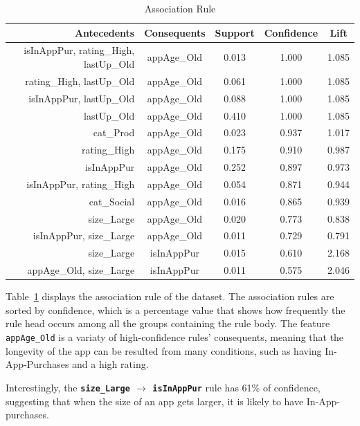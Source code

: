 \begin{table}
    \centering
    \scriptsize
        \begin{tabular}{rcccc}
        \toprule
        Antecedents & Consequents & Support & Confidence & Lift \\
        \midrule
        {isInAppPur, rating\_High, lastUp\_Old} & {appAge\_Old} & 0.013 & 1.000 & 1.085 \\
        {rating\_High, lastUp\_Old} & {appAge\_Old} & 0.061 & 1.000 & 1.085 \\
        {isInAppPur, lastUp\_Old} & {appAge\_Old} & 0.088 & 1.000 & 1.085 \\
        {lastUp\_Old} & {appAge\_Old} & 0.410 & 1.000 & 1.085 \\
        {cat\_Prod} & {appAge\_Old} & 0.023 & 0.937 & 1.017 \\
        {rating\_High} & {appAge\_Old} & 0.175 & 0.910 & 0.987 \\
        {isInAppPur} & {appAge\_Old} & 0.252 & 0.897 & 0.973 \\
        {isInAppPur, rating\_High} & {appAge\_Old} & 0.054 & 0.871 & 0.944 \\
        {cat\_Social} & {appAge\_Old} & 0.016 & 0.865 & 0.939 \\
        {size\_Large} & {appAge\_Old} & 0.020 & 0.773 & 0.838 \\
        {isInAppPur, size\_Large} & {appAge\_Old} & 0.011 & 0.729 & 0.791 \\
        {size\_Large} & {isInAppPur} & 0.015 & 0.610 & 2.168 \\
        {appAge\_Old, size\_Large} & {isInAppPur} & 0.011 & 0.575 & 2.046 \\
        \end{tabular}
    \caption{Association Rule}
    \label{tab:ar}
\end{table}

Table~\ref{tab:ar} displays the association rule of the dataset. The association rules are sorted by confidence, which is a percentage value that shows how frequently the rule head occurs among all the groups containing the rule body. The feature \texttt{appAge\_Old} is a variaty of high-confidence rules' consequents, meaning that the longevity of the app can be resulted from many conditions, such as having In-App-Purchases and a high rating.

Interestingly, the \textbf{\texttt{size\_Large} $\rightarrow$ \texttt{isInAppPur}} rule has 61\% of confidence, suggesting that when the size of an app gets larger, it is likely to have In-App-purchases.